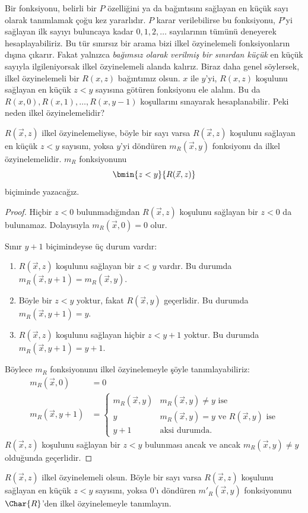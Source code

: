 \documentclass[../../../include/open-logic-section]{subfiles}
\begin{document}

\begin{explain}
Bir fonksiyonu, belirli bir $P$ özelliğini ya da bağıntısını sağlayan en küçük
sayı olarak tanımlamak çoğu kez yararlıdır. $P$ karar verilebilirse bu
fonksiyonu, $P$'yi sağlayan ilk sayıyı buluncaya kadar $0,1,2,\dots$
sayılarının tümünü deneyerek hesaplayabiliriz. Bu tür sınırsız bir arama bizi
ilkel özyinelemeli fonksiyonların dışına çıkarır. Fakat yalnızca
\emph{bağımsız olarak verilmiş bir sınırdan küçük} en küçük sayıyla
ilgileniyorsak ilkel özyinelemeli alanda kalırız. Biraz daha genel söylersek,
ilkel özyinelemeli bir $R(x,z)$ bağıntımız olsun. $x$ ile $y$'yi,
$R(x,z)$ koşulunu sağlayan en küçük $z<y$ sayısına götüren fonksiyonu ele
alalım. Bu da $R(x,0),R(x,1),\dots,R(x,y-1)$ koşullarını sınayarak
hesaplanabilir. Peki neden ilkel özyinelemelidir?
\end{explain}

\begin{prop}
$R(\vec x,z)$ ilkel özyinelemeliyse, böyle bir sayı varsa $R(\vec x,z)$
koşulunu sağlayan en küçük $z<y$ sayısını, yoksa $y$'yi döndüren
$m_R(\vec x,y)$ fonksiyonu da ilkel özyinelemelidir. $m_R$ fonksiyonunu
\[
  \bmin{z<y}{R(\vec x,z)}
\]
biçiminde yazacağız.
\end{prop}

\begin{proof}
Hiçbir $z<0$ bulunmadığından $R(\vec x,z)$ koşulunu sağlayan bir $z<0$ da
bulunamaz. Dolayısıyla $m_R(\vec x,0)=0$ olur.

Sınır $y+1$ biçimindeyse üç durum vardır:
\begin{enumerate}
\item $R(\vec x,z)$ koşulunu sağlayan bir $z<y$ vardır. Bu durumda
  $m_R(\vec x,y+1)=m_R(\vec x,y)$.
\item Böyle bir $z<y$ yoktur, fakat $R(\vec x,y)$ geçerlidir. Bu durumda
  $m_R(\vec x,y+1)=y$.
\item $R(\vec x,z)$ koşulunu sağlayan hiçbir $z<y+1$ yoktur. Bu durumda
  $m_R(\vec x,y+1)=y+1$.
\end{enumerate}
Böylece $m_R$ fonksiyonunu ilkel özyinelemeyle şöyle tanımlayabiliriz:
\begin{align*}
  m_R(\vec x,0) & = 0\\
  m_R(\vec x,y+1) & = \begin{cases}
    m_R(\vec x,y) & \text{$m_R(\vec x,y)\neq y$ ise}\\
    y & \text{$m_R(\vec x,y)=y$ ve $R(\vec x,y)$ ise}\\
    y+1 & \text{aksi durumda.}
  \end{cases}
\end{align*}
$R(\vec x,z)$ koşulunu sağlayan bir $z<y$ bulunması ancak ve ancak
$m_R(\vec x,y)\neq y$ olduğunda geçerlidir.
\end{proof}

\begin{prob}
$R(\vec x,z)$ ilkel özyinelemeli olsun. Böyle bir sayı varsa
$R(\vec x,z)$ koşulunu sağlayan en küçük $z<y$ sayısını, yoksa $0$'ı
döndüren $m'_R(\vec x,y)$ fonksiyonunu $\Char{R}$'den ilkel özyinelemeyle
tanımlayın.
\end{prob}
\end{document}

